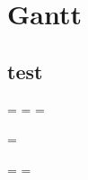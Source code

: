 \chapter{Gantt}

\section{test}

\newpage

\paperwidth=\pdfpageheight
{}\pdfpagewidth
\pdfpageheight=\paperheight
\pdfpagewidth=\paperwidth
{}\textheight

\begingroup 
\vsize=\textwidth
{}\textheight

\textwidth=\hsize
\textheight=\vsize



